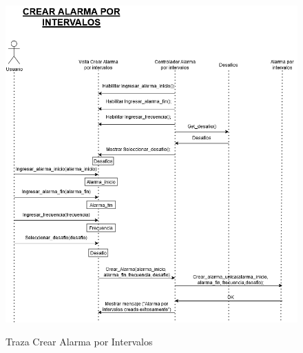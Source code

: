  \begin{figure}[H]
	\centering
	\caption{Traza Crear Alarma por Intervalos}
	\includegraphics[width=\textwidth]{./img/Crear_alarma_intervalos.png}
        \vspace{10pt}
	\label{fig:Traza Crear Alarma por Intervalos}
\end{figure}

